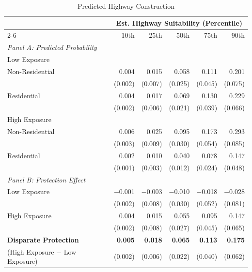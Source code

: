 \begin{table}[h]
\centering
\caption{Predicted Highway Construction }
\label{tab:slides/predicted_outcomes/black_share_sweep}
\begin{threeparttable}
\begin{tabular*}{1\textwidth}{@{\extracolsep{\fill}}lr@{\hspace{1.2em}}r@{\hspace{1.2em}}r@{\hspace{1.2em}}r@{\hspace{1.2em}}r@{\hspace{1.2em}}}
\toprule
 & \multicolumn{5}{c}{Est. Highway Suitability (Percentile)} \\
\cmidrule(l){2-6}
 & 10th & 25th & 50th & 75th & 90th \\
\midrule
\textit{Panel A: Predicted Probability} & & & & & \\
\addlinespace[2pt]
Low Exposure & & & & & \\
\quad Non-Residential & 0.004 & 0.015 & 0.058 & 0.111 & 0.201 \\
 & (0.002) & (0.007) & (0.025) & (0.045) & (0.075) \\[4pt]
\quad Residential & 0.004 & 0.017 & 0.069 & 0.130 & 0.229 \\
 & (0.002) & (0.006) & (0.021) & (0.039) & (0.066) \\[4pt]
High Exposure & & & & & \\
\quad Non-Residential & 0.006 & 0.025 & 0.095 & 0.173 & 0.293 \\
 & (0.003) & (0.009) & (0.030) & (0.054) & (0.085) \\[4pt]
\quad Residential & 0.002 & 0.010 & 0.040 & 0.078 & 0.147 \\
 & (0.001) & (0.003) & (0.012) & (0.024) & (0.048) \\[4pt]
\midrule
\textit{Panel B: Protection Effect} & & & & & \\
\addlinespace[2pt]
Low Exposure & $-$0.001 & $-$0.003 & $-$0.010 & $-$0.018 & $-$0.028 \\
 & (0.002) & (0.008) & (0.030) & (0.052) & (0.081) \\[4pt]
High Exposure & 0.004\rlap{$^{*}$} & 0.015\rlap{$^{*}$} & 0.055\rlap{$^{**}$} & 0.095\rlap{$^{**}$} & 0.147\rlap{$^{**}$} \\
 & (0.002) & (0.008) & (0.027) & (0.045) & (0.065) \\[4pt]
\addlinespace[2pt]
\textbf{Disparate Protection} & \textbf{0.005}\rlap{$^{***}$} & \textbf{0.018}\rlap{$^{***}$} & \textbf{0.065}\rlap{$^{***}$} & \textbf{0.113}\rlap{$^{***}$} & \textbf{0.175}\rlap{$^{***}$} \\
(High Exposure $-$ Low Exposure) & (0.002) & (0.006) & (0.022) & (0.040) & (0.062) \\
\bottomrule
\end{tabular*}
\end{threeparttable}
\end{table}
